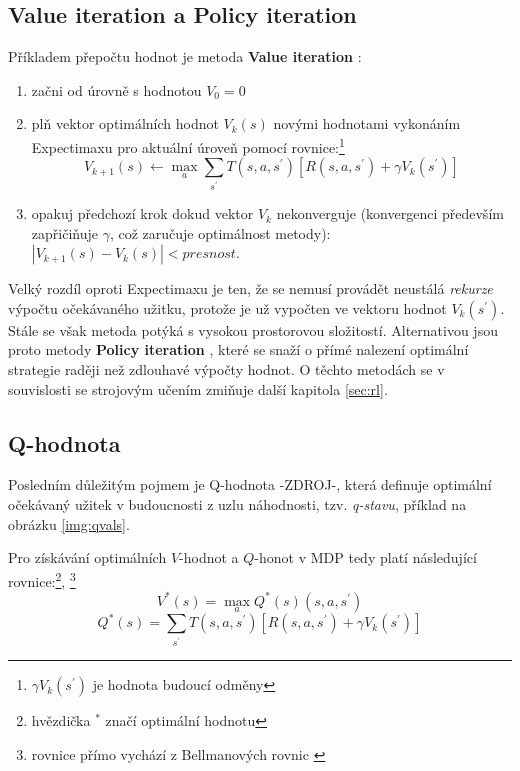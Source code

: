 \subsection{Value iteration a Policy iteration}
Příkladem přepočtu hodnot je metoda \textbf{Value iteration} \cite{RLAprox}:
\begin{enumerate}
\item začni od úrovně s hodnotou $V_{0} = 0$
\item plň vektor optimálních hodnot $V_{k}(s)$ novými hodnotami vykonáním Expectimaxu pro aktuální úroveň pomocí rovnice:\footnote{$\gamma V_k(s^\prime)$ je hodnota budoucí odměny}
\begin{displaymath}
V_{k+1}(s) \leftarrow \max_a \sum_{s^\prime}T(s,a,s^\prime) \left[R(s,a,s^\prime)+\gamma V_k(s^\prime) \right]
\end{displaymath}
\item opakuj předchozí krok dokud vektor $V_k$ nekonverguje (konvergenci především zapřičiňuje $\gamma$, což zaručuje optimálnost metody): $\left|V_{k+1}(s)-V_k(s) \right| < presnost$.
\end{enumerate}
Velký rozdíl oproti Expectimaxu je ten, že se nemusí provádět neustálá \textit{rekurze} výpočtu očekávaného užitku, protože je už vypočten ve vektoru hodnot $V_k(s^\prime)$. Stále se však metoda potýká s vysokou prostorovou složitostí. Alternativou jsou proto metody \textbf{Policy iteration} \cite{RLAprox}, které se snaží o přímé nalezení optimální strategie raději než zdlouhavé výpočty hodnot. O těchto metodách se v souvislosti se strojovým učením zmiňuje další kapitola \ref{sec:rl}.

\subsection{Q-hodnota}
Posledním důležitým pojmem je Q-hodnota -ZDROJ-, která definuje optimální očekávaný užitek v budoucnosti z uzlu náhodnosti, tzv. \textit{q-stavu}, příklad na obrázku \ref{img:qvals}.

Pro získávání optimálních $V$-hodnot a $Q$-honot  v MDP tedy platí následující rovnice:\footnote{hvězdička $^{*}$ značí optimální hodnotu}, \footnote{rovnice přímo vychází z Bellmanových rovnic \cite{mas}}
\begin{displaymath}
V^*(s) = \max_a Q^*(s) (s,a,s^\prime)
\end{displaymath}
\begin{displaymath}
Q^*(s) = \sum_{s^\prime}T(s,a,s^\prime) \left[R(s,a,s^\prime)+\gamma V_k(s^\prime) \right]
\end{displaymath}


